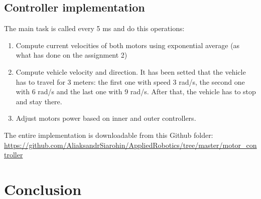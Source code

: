 \documentclass[a4paper,12pt,oneside]{article}
\begin{document}
\subsection{Controller implementation}
The main task is called every 5 ms and do this operations:
\begin{enumerate}
\item Compute current velocities of both motors using exponential average (as what has done on the assignment 2)
\item Compute vehicle velocity and direction. It has been setted that the vehicle has to travel for 3 meters: the first one with speed 3 rad/s, the second one with 6 rad/s and the last one with 9 rad/s. After that, the vehicle has to stop and stay there.
\item Adjust motors power based on inner and outer controllers.
\end{enumerate}

The entire implementation is downloadable from this Github folder: \url{https://github.com/AliaksandrSiarohin/AppliedRobotics/tree/master/motor_controller}
\section{Conclusion}
\end{document}
